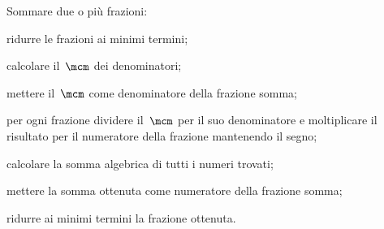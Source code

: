 \begin{procedura}
Sommare due o più frazioni:
\begin{enumeratea}
\item ridurre le frazioni ai minimi termini;
\item calcolare il~$\mcm$ dei denominatori;
\item mettere il~$\mcm$ come denominatore della frazione somma;
\item per ogni frazione dividere il~$\mcm$ per il suo denominatore e moltiplicare il risultato per il
numeratore della frazione mantenendo il segno;
\item calcolare la somma algebrica di tutti i numeri trovati;
\item mettere la somma ottenuta come numeratore della frazione somma;
\item ridurre ai minimi termini la frazione ottenuta.
\end{enumeratea}
\end{procedura}

